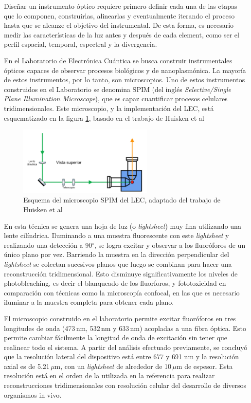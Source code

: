 Diseñar un instrumento óptico requiere primero definir cada una de las etapas que lo componen, construirlas, alinearlas y eventualmente iterando el proceso hasta que se alcanze el objetivo del instrumental. De esta forma, es necesario medir las características de la luz antes y después de cada element, como ser el perfil espacial, temporal, espectral y la divergencia. 

En el Laboratorio de Electrónica Cuántica se busca construir instrumentales ópticos capaces de observar procesos biológicos y de nanoplasmónica. La mayoría de estos instrumentos, por lo tanto, son microscopios. Uno de estos instrumentos construidos en el Laboratorio se denomina SPIM (del inglés \textit{Selective/Single Plane Illumination Microscope}), que es capaz cuantificar procesos celulares tridimensionales. Este microscopio, y la implementación del LEC, está esquematizado en la figura \ref{fig:spim_lec}, basado en el trabajo de Huisken et al\cite{huisken2004}

\begin{figure}[H]
    \centering
    \includegraphics[width=0.6\textwidth]{fig/spim_lec}
    \caption{Esquema del microscopio SPIM del LEC, adaptado del trabajo de Huisken et al \cite{huisken2004}}
    \label{fig:spim_lec}
\end{figure}
En esta técnica se genera una hoja de luz (o \textit{lightsheet}) muy fina utilizando una lente cilíndrica. Iluminando a una muestra fluorescente con este \textit{lightsheet} y realizando una detección a 90$^{\circ}$, se logra excitar y observar a los fluoróforos de un único plano por vez. Barriendo la muestra en la dirección perpendicular del \textit{lightsheet} se colectan sucesivos planos que luego se combinan para hacer una reconstrucción tridimensional. Esto disminuye significativamente los niveles de photobleaching, es decir el blanqueado de los fluorforos, y fototoxicidad en comparación con técnicas como la microscopía confocal, en las que es necesario iluminar a la muestra completa para obtener cada plano. 

El microscopio construido en el laboratorio permite excitar fluoróforos en tres longitudes de onda (473$\,$nm, 532$\,$nm y 633$\,$nm) acopladas a una fibra óptica. Esto permite cambiar fácilmente la longitud de onda de excitación sin tener que realinear todo el sistema. A partir del análisis efectuado previamente, se concluyó que la resolución lateral del dispositivo está entre 677 y 691 nm y la resolución axial es de 5.21$\,\mu$m, con un \textit{lightsheet} de alrededor de 10$\,\mu$m de espesor. Esta resolución está en el orden de la utilizada en la referencia\cite{huisken2004} para realizar reconstrucciones tridimensionales con resolución celular del desarrollo de diversos organismos in vivo.

